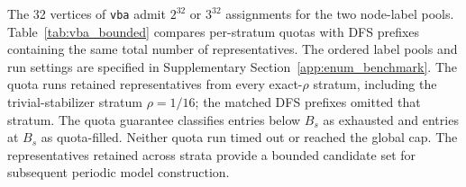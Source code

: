 \documentclass[a5paper, 10pt]{article}
\begin{document}
The 32 vertices of \texttt{vba} admit $2^{32}$ or $3^{32}$ assignments for the two node-label pools. Table~\ref{tab:vba_bounded} compares per-stratum quotas with DFS prefixes containing the same total number of representatives. The ordered label pools and run settings are specified in Supplementary Section~\ref{app:enum_benchmark}. The quota runs retained representatives from every exact-$\rho$ stratum, including the trivial-stabilizer stratum $\rho=1/16$; the matched DFS prefixes omitted that stratum. The quota guarantee classifies entries below $B_s$ as exhausted and entries at $B_s$ as quota-filled. Neither quota run timed out or reached the global cap. The representatives retained across strata provide a bounded candidate set for subsequent periodic model construction.
\end{document}
